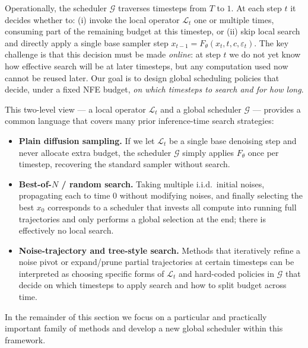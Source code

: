 Operationally, the scheduler $\mathcal{G}$ traverses timesteps from $T$ to $1$.
At each step $t$ it decides whether to:
(i) invoke the local operator $\mathcal{L}_t$ one or multiple times, consuming
part of the remaining budget at this timestep, or
(ii) skip local search and directly apply a single base sampler step
$x_{t-1} = F_\theta(x_t, t, c, \varepsilon_t)$.
The key challenge is that this decision must be made \emph{online}: at step $t$
we do not yet know how effective search will be at later timesteps, but any
computation used now cannot be reused later.
Our goal is to design global scheduling policies that decide, under a fixed NFE
budget, \emph{on which timesteps to search and for how long}.

This two-level view --- a local operator $\mathcal{L}_t$ and a global scheduler
$\mathcal{G}$ --- provides a common language that covers many prior
inference-time search strategies:
\begin{itemize}
  \item \textbf{Plain diffusion sampling.}
  If we let $\mathcal{L}_t$ be a single base denoising step and never allocate
  extra budget, the scheduler $\mathcal{G}$ simply applies $F_\theta$ once per
  timestep, recovering the standard sampler without search.
  \item \textbf{Best-of-$N$ / random search.}
  Taking multiple i.i.d.\ initial noises, propagating each to time $0$ without
  modifying noises, and finally selecting the best $x_0$ corresponds to a
  scheduler that invests all compute into running full trajectories and only
  performs a global selection at the end; there is effectively no local search.
  \item \textbf{Noise-trajectory and tree-style search.}
  Methods that iteratively refine a noise pivot or expand/prune partial
  trajectories at certain timesteps can be interpreted as choosing specific
  forms of $\mathcal{L}_t$ and hard-coded policies in $\mathcal{G}$ that decide
  on which timesteps to apply search and how to split budget across time.
\end{itemize}
In the remainder of this section we focus on a particular and practically
important family of methods and develop a new global scheduler within this
framework.
